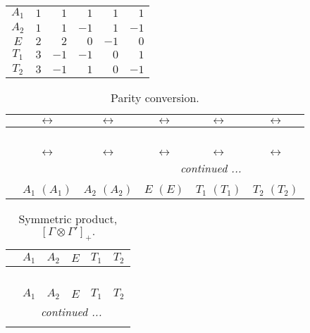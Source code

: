 \documentclass[fleqn,10pt,landscape]{article}
\begin{document}
\begin{itemize}
\begin{center}
\begin{longtable}{c|rrrrr}
$ A_{1} $ & $ 1 $ & $ 1 $ & $ 1 $ & $ 1 $ & $ 1 $ \\
$ A_{2} $ & $ 1 $ & $ 1 $ & $ -1 $ & $ 1 $ & $ -1 $ \\
$ E $ & $ 2 $ & $ 2 $ & $ 0 $ & $ -1 $ & $ 0 $ \\
$ T_{1} $ & $ 3 $ & $ -1 $ & $ -1 $ & $ 0 $ & $ 1 $ \\
$ T_{2} $ & $ 3 $ & $ -1 $ & $ 1 $ & $ 0 $ & $ -1 $ \\
\end{longtable}
\end{center}
\begin{center}
\renewcommand{\arraystretch}{1.0}
\begin{longtable}{cccccc}
\caption{Parity conversion.}
 \\
 \hline \hline
 & $\leftrightarrow$ & $\leftrightarrow$ & $\leftrightarrow$ & $\leftrightarrow$ & $\leftrightarrow$ \\ \hline \endfirsthead

\multicolumn{5}{l}{\tablename\ \thetable{}} \\
 \hline \hline
 & $\leftrightarrow$ & $\leftrightarrow$ & $\leftrightarrow$ & $\leftrightarrow$ & $\leftrightarrow$ \\ \hline \endhead

 \hline \hline
\multicolumn{5}{r}{\footnotesize\it continued ...} \\ \endfoot

 \hline \hline
\multicolumn{5}{r}{} \\ \endlastfoot

 & $ A_{1}\,\,(A_{1}) $ & $ A_{2}\,\,(A_{2}) $ & $ E\,\,(E) $ & $ T_{1}\,\,(T_{1}) $ & $ T_{2}\,\,(T_{2}) $ \\
\end{longtable}
\end{center}
\begin{center}
\renewcommand{\arraystretch}{1.0}
\begin{longtable}{c|ccccc}
\caption{Symmetric product, $[\Gamma\otimes\Gamma']_+.$}
 \\
 \hline \hline
 & $ A_{1} $ & $ A_{2} $ & $ E $ & $ T_{1} $ & $ T_{2} $ \\ \hline \endfirsthead

\multicolumn{5}{l}{\tablename\ \thetable{}} \\
 \hline \hline
 & $ A_{1} $ & $ A_{2} $ & $ E $ & $ T_{1} $ & $ T_{2} $ \\ \hline \endhead

 \hline \hline
\multicolumn{5}{r}{\footnotesize\it continued ...} \\ \endfoot


\end{longtable}
\end{center}
\end{itemize}
\end{document}

